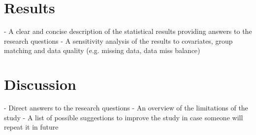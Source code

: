 \documentclass[]{article}
\begin{document}
\section{Results}

- A clear and concise description of the statistical results 
providing answers to the research questions
\newline
- A sensitivity analysis of the results to covariates, group  matching and data quality (e.g. missing data, data miss balance)

\section{Discussion}

- Direct answers to the research questions
\newline
- An overview of the limitations of the study
\newline
- A list of possible suggestions to improve the study in case 
someone will repeat it in future
\end{document}
